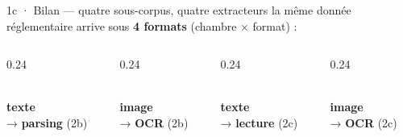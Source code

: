 \documentclass[11pt,aspectratio=169]{beamer}
\begin{document}
\begin{frame}{1c · Bilan --- quatre sous-corpus, quatre extracteurs}
  \centering
  \vspace{2mm}
  {\footnotesize la même donnée réglementaire arrive sous \textbf{4 formats}
   (chambre × format) :}\\[2mm]
  \begin{columns}[T]
    \begin{column}{0.24\textwidth}\centering
      \colorbox{helec}{\parbox{0.94\linewidth}{\centering{}\vspace{0.4mm}}}\\[1mm]
      {\scriptsize \textbf{texte}\\→ \textbf{parsing} (2b)}
    \end{column}
    \begin{column}{0.24\textwidth}\centering
      \colorbox{hocr}{\parbox{0.94\linewidth}{\centering{}\vspace{0.4mm}}}\\[1mm]
      {\scriptsize \textbf{image}\\→ \textbf{OCR} (2b)}
    \end{column}
    \begin{column}{0.24\textwidth}\centering
      \colorbox{selec}{\parbox{0.94\linewidth}{\centering{}\vspace{0.4mm}}}\\[1mm]
      {\scriptsize \textbf{texte}\\→ \textbf{lecture} (2c)}
    \end{column}
    \begin{column}{0.24\textwidth}\centering
      \colorbox{socr}{\parbox{0.94\linewidth}{\centering{}\vspace{0.4mm}}}\\[1mm]
      {\scriptsize \textbf{image}\\→ \textbf{OCR} (2c)}
    \end{column}
  \end{columns}
\end{frame}
\end{document}
